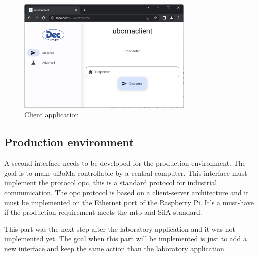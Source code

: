 \begin{figure}[H]
    \centering
    \includegraphics[width=0.75\textwidth]{img/results_clientApp.png}
    \caption{Client application}
    \label{ch:results:interface:laboratory:figure}
\end{figure}


\subsection{Production environment}
\label{ch:results:interface:production}

A second interface needs to be developed for the production environment.
The goal is to make uBoMa controllable by a central computer.
This interface must implement the protocol \acrfull{opc}, this is a standard protocol for industrial communication.
The \acrshort{opc} protocol is based on a client-server architecture and it must be implemented on the Ethernet port of the Raspberry Pi.
It's a must-have if the production requirement meets the \acrfull{mtp} and SilA standard.

This part was the next step after the laboratory application and it was not implemented yet.
The goal when this part will be implemented is just to add a new interface and keep the same action than the laboratory application.
